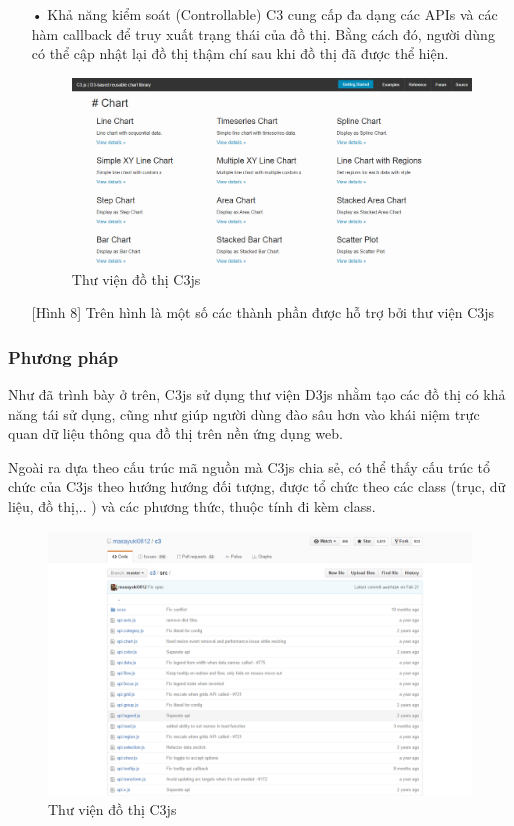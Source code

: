 \documentclass[12pt,a4paper,oneside]{article}
\begin{document}
\begin{itemize}
        \item[•]Khả năng kiểm soát (Controllable)
        C3 cung cấp đa dạng các APIs và các hàm callback để truy xuất trạng thái của đồ thị. Bằng cách đó, người dùng có thể cập nhật lại đồ thị thậm chí sau khi đồ thị đã được thể hiện.
\begin{figure}[htp]
    \includegraphics[scale=.4]{image/c3apis}
    \caption{Thư viện đồ thị C3js}
    \label{refhinh8}
\end{figure}
[Hình 8] Trên hình là một số các thành phần được hỗ trợ bởi thư viện C3js
\end{itemize}

\subsubsection{Phương pháp}
Như đã trình bày ở trên, C3js sử dụng thư viện D3js nhằm tạo các đồ thị có khả năng tái sử dụng, cũng như giúp người dùng đào sâu hơn vào khái niệm trực quan dữ liệu thông qua đồ thị trên nền ứng dụng web.

Ngoài ra dựa theo cấu trúc mã nguồn mà C3js chia sẻ, có thể thấy cấu trúc tổ chức của C3js theo hướng hướng đối tượng, được tổ chức theo các class (trục, dữ liệu, đồ thị,.. ) và các phương thức, thuộc tính đi kèm class.

\begin{figure}[htp]
    \includegraphics[scale=.4]{image/c3source}
    \caption{Thư viện đồ thị C3js}
    \label{refhinh9}
\end{figure}
\end{document}
